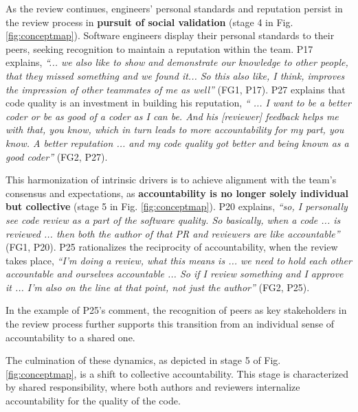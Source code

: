 As the review continues, engineers' personal standards and reputation persist in the review process in \textbf{pursuit of social validation} (stage 4 in Fig. \ref{fig:conceptmap}). Software engineers display their personal standards to their peers, seeking recognition to maintain a reputation within the team. P17 explains, \emph{``... we also like to show and demonstrate our knowledge to other people, that they missed something and we found it... So this also like, I think, improves the impression of other teammates of me as well''} (FG1, P17). P27 explains that code quality is an investment in building his reputation, \emph{`` ... I want to be a better coder or be as good of a coder as I can be. And his [reviewer] feedback helps me with that, you know, which in turn leads to more accountability for my part, you know. A better reputation ... and my code quality got better and being known as a good coder''} (FG2, P27).

This harmonization of intrinsic drivers is to achieve alignment with the team's consensus and expectations, as \textbf{accountability is no longer solely individual but collective} (stage 5 in Fig. \ref{fig:conceptmap}). P20 explains, \emph{``so, I personally see code review as a part of the software quality. So basically, when a code ... is reviewed ... then both the author of that PR and reviewers are like accountable''} (FG1, P20). P25 rationalizes the reciprocity of accountability, when the review takes place, \emph{``I'm doing a review, what this means is ... we need to hold each other accountable and ourselves accountable ... So if I review something and I approve it ... I'm also on the line at that point, not just the author''} (FG2, P25).

In the example of P25's comment, the recognition of peers as key stakeholders in the review process further supports this transition from an individual sense of accountability to a shared one.

The culmination of these dynamics, as depicted in stage 5 of Fig. \ref{fig:conceptmap}, is a shift to collective accountability. This stage is characterized by shared responsibility, where both authors and reviewers internalize accountability for the quality of the code.

